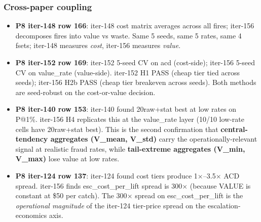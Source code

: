 \subsubsection{Cross-paper coupling}
\begin{itemize}
  \item \textbf{P8 iter-148 row 166}: iter-148 cost matrix averages
    across all fires; iter-156 decomposes fires into value vs waste.
    Same 5 seeds, same 5 rates, same 4 fsets; iter-148 measures
    \emph{cost}, iter-156 measures \emph{value}.
  \item \textbf{P8 iter-152 row 169}: iter-152 5-seed CV on
    acd (cost-side); iter-156 5-seed CV on value\_rate
    (value-side).  iter-152 H1 PASS (cheap tier tied across seeds);
    iter-156 H2b PASS (cheap tier breakeven across seeds).  Both
    methods are seed-robust on the cost-or-value decision.
  \item \textbf{P8 iter-140 row 153}: iter-140 found 20raw+stat
    best at low rates on P@1\%.  iter-156 H4 replicates this at the
    value\_rate layer (10/10 low-rate cells have 20raw+stat best).
    This is the second confirmation that \textbf{central-tendency
    aggregates (V\_mean, V\_std)} carry the operationally-relevant
    signal at realistic fraud rates, while \textbf{tail-extreme
    aggregates (V\_min, V\_max)} lose value at low rates.
  \item \textbf{P8 iter-124 row 137}: iter-124 found cost tiers
    produce 1$\times$--3.5$\times$ ACD spread.  iter-156 finds
    esc\_cost\_per\_lift spread is 300$\times$ (because VALUE is
    constant at \$50 per catch).  The 300$\times$ spread on
    esc\_cost\_per\_lift is the \emph{operational magnitude} of the
    iter-124 tier-price spread on the escalation-economics axis.
\end{itemize}